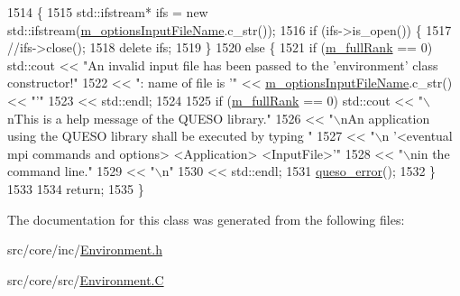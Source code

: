 \begin{DoxyCode}
1514 \{
1515   std::ifstream* ifs = \textcolor{keyword}{new} std::ifstream(\hyperlink{class_q_u_e_s_o_1_1_base_environment_a37195909442a817980e1cf8392b9e63d}{m\_optionsInputFileName}.c\_str());
1516   \textcolor{keywordflow}{if} (ifs->is\_open()) \{
1517     \textcolor{comment}{//ifs->close();}
1518     \textcolor{keyword}{delete} ifs;
1519   \}
1520   \textcolor{keywordflow}{else} \{
1521     \textcolor{keywordflow}{if} (\hyperlink{class_q_u_e_s_o_1_1_base_environment_a0bfa53f6bdaec0a6aa3dc00ee2c0101f}{m\_fullRank} == 0) std::cout << \textcolor{stringliteral}{"An invalid input file has been passed to the 'environment'
       class constructor!"}
1522                                    << \textcolor{stringliteral}{": name of file is '"} << 
      \hyperlink{class_q_u_e_s_o_1_1_base_environment_a37195909442a817980e1cf8392b9e63d}{m\_optionsInputFileName}.c\_str() << \textcolor{stringliteral}{"'"}
1523                                    << std::endl;
1524 
1525     \textcolor{keywordflow}{if} (\hyperlink{class_q_u_e_s_o_1_1_base_environment_a0bfa53f6bdaec0a6aa3dc00ee2c0101f}{m\_fullRank} == 0) std::cout << \textcolor{stringliteral}{"\(\backslash\)nThis is a help message of the QUESO library."}
1526                                    << \textcolor{stringliteral}{"\(\backslash\)nAn application using the QUESO library shall be executed by typing
      "}
1527                                    << \textcolor{stringliteral}{"\(\backslash\)n  '<eventual mpi commands and options> <Application> <InputFile>'"}
1528                                    << \textcolor{stringliteral}{"\(\backslash\)nin the command line."}
1529                                    << \textcolor{stringliteral}{"\(\backslash\)n"}
1530                                    << std::endl;
1531     \hyperlink{asserts_8h_a0af4fa8de607265fa3e7413ba0475a18}{queso\_error}();
1532   \}
1533 
1534   \textcolor{keywordflow}{return};
1535 \}
\end{DoxyCode}


The documentation for this class was generated from the following files\-:\begin{DoxyCompactItemize}
\item 
src/core/inc/\hyperlink{_environment_8h}{Environment.\-h}\item 
src/core/src/\hyperlink{_environment_8_c}{Environment.\-C}\end{DoxyCompactItemize}
